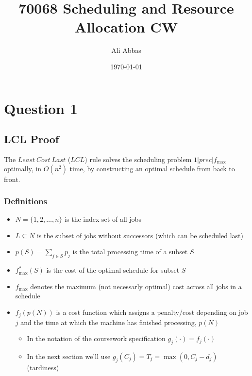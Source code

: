 \documentclass[fleqn]{article}
\date{\today}
\author{Ali Abbas}
\title{70068 Scheduling and Resource Allocation CW}
\begin{document}
  \maketitle
  \section{Question 1}
  \subsection{LCL Proof}
  The $Least\ Cost\ Last$ ($LCL$) rule solves the scheduling problem $1 | prec | f_{\text{max}}$ optimally, in $O(n^2)$ time, by constructing
  an optimal schedule from back to front.

  \subsubsection*{Definitions}
  \begin{itemize}
    \item $N = \{ 1, 2, \dots, n \}$ is the index set of all jobs
    \item $L \subseteq N$ is the subset of jobs without successors (which can be scheduled last)
    \item $p(S) = \sum_{j \in S} p_j$ is the total processing time of a subset $S$
    \item $f^*_{\text{max}}(S)$ is the cost of the optimal schedule for subset $S$
    \item $f_{\text{max}}$ denotes the maximum (not necessarly optimal) cost across all jobs in a schedule
    \item $f_j(p(N))$ is a cost function which assigns a penalty/cost depending on job $j$ and the time at which the machine has finished processing, $p(N)$
    \begin{itemize}
      \item In the notation of the coursework specification $g_j(\cdot) = f_j(\cdot)$
      \item In the next section we'll use $g_j(C_j) = T_j = \max(0, C_j - d_j)$ (tardiness)
    \end{itemize}
  \end{itemize}
\end{document}
